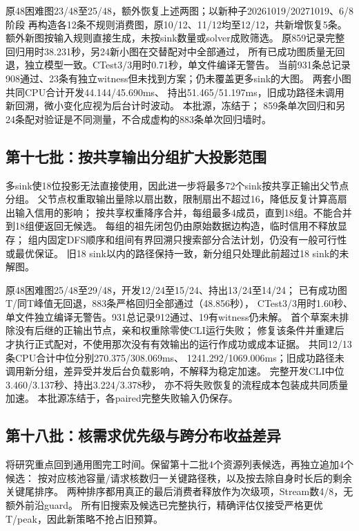 \documentclass[UTF8,a4paper,11pt,fontset=fandol]{ctexart}
\begin{document}
原48困难图23/48至25/48，额外恢复上述两图；以新种子20261019/20271019、6/8阶段
再构造各12条不规则消费图，原10/12、11/12均至12/12，共新增恢复5条。
额外新图按输入规则直接生成，未按sink数量或solver成败筛选。
原859记录完整回归用时38.231秒，另24新小图在交替配对中全部通过，
所有已成功图质量无回退，独立模型一致。CTest3/3用时0.71秒，单文件编译无警告。
当前931条总记录908通过、23条有独立witness但未找到方案；仍未覆盖更多sink的大图。
两套小图共同CPU合计开发44.144/\allowbreak{}45.690ms、
持出51.465/\allowbreak{}51.197ms，旧成功路径未调用新回溯，微小变化应视为后台计时波动。
本批源，冻结于；
859条单次回归和另24条配对验证是不同测量，不合成虚构的883条单次回归墙时。

\subsection{第十七批：按共享输出分组扩大投影范围}
多sink使18位投影无法直接使用，因此进一步将最多72个sink按共享正输出父节点分组。
父节点权重取输出量除以扇出数，限制扇出不超过16，降低反复计算高扇出输入信用的影响；
按共享权重降序合并，每组最多4成员，直到18组。不能合并到18组便返回无候选。
每组的祖先闭包仍由原始数据边构造，临时信用不释放显存；
组内固定DFS顺序和组间有界回溯只搜索部分合法计划，仍没有一般可行性或最优保证。
旧18 sink以内的路径保持一致，新分组只处理此前超过18 sink的未解图。

原48困难图25/48至29/48，开发12/24至15/24、持出13/24至14/24；
已有成功图T/同T峰值无回退，883条严格回归全部通过（48.856秒），
CTest3/3用时1.60秒、单文件独立编译无警告。931总记录912通过、19有witness仍未解。
首个草案未排除没有后继的正输出节点，亲和权重除零使CLI运行失败；
修复该条件并重建后才执行正式配对，不使用那次没有有效输出的运行作成功或成本证据。
共同12/13条CPU合计中位分别270.375/\allowbreak{}308.069ms、
1241.292/\allowbreak{}1069.006ms；旧成功路径未调用新分组，差异受并发后台负载影响，不解释为稳定加速。
完整开发CLI中位3.460/\allowbreak{}3.137秒、持出3.224/\allowbreak{}3.378秒，
亦不将失败恢复的流程成本包装成共同质量加速。
本批源冻结于，各paired完整失败输入仍保存。

\subsection{第十八批：核需求优先级与跨分布收益差异}
将研究重点回到通用图完工时间。保留第十二批4个资源列表候选，再独立追加4个候选：
按对应核池容量/请求核数归一关键路径秩，以及按去除自身时长后的剩余关键尾排序。
两种排序都用真正的最后消费者释放作为次级项，Stream数4/8，无额外前沿guard。
所有旧搜索及候选已完整执行，精确评估仅接受严格更优T/peak，因此新策略不抢占旧预算。
\end{document}
